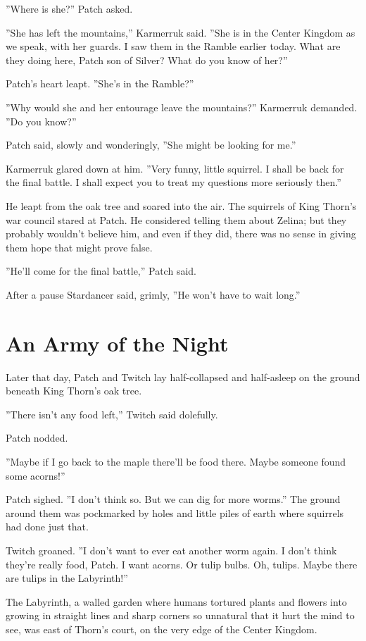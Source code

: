 \documentclass[12pt]{book}
\begin{document}
''Where is she?'' Patch asked.

''She has left the mountains,'' Karmerruk said. ''She is in the Center
Kingdom as we speak, with her guards. I saw them in the Ramble earlier
today. What are they doing here, Patch son of Silver? What do you know
of her?''

Patch's heart leapt. ''She's in the Ramble?''

''Why would she and her entourage leave the mountains?'' Karmerruk
demanded. ''Do you know?''

Patch said, slowly and wonderingly, ''She might be looking for me.''

Karmerruk glared down at him. ''Very funny, little squirrel. I shall
be back for the final battle. I shall expect you to treat my questions
more seriously then.''

He leapt from the oak tree and soared into the air. The squirrels of
King Thorn's war council stared at Patch. He considered telling them
about Zelina; but they probably wouldn't believe him, and even if they
did, there was no sense in giving them hope that might prove false.

''He'll come for the final battle,'' Patch said.

After a pause Stardancer said, grimly, ''He won't have to wait long.''


\section{An Army of the Night}

Later that day, Patch and Twitch lay half-collapsed and half-asleep on
the ground beneath King Thorn's oak tree.

''There isn't any food left,'' Twitch said dolefully.

Patch nodded.

''Maybe if I go back to the maple there'll be food there. Maybe
someone found some acorns!''

Patch sighed. ''I don't think so. But we can dig for more worms.'' The
ground around them was pockmarked by holes and little piles of earth
where squirrels had done just that.

Twitch groaned. ''I don't want to ever eat another worm again. I don't
think they're really food, Patch. I want acorns. Or tulip bulbs. Oh,
tulips. Maybe there are tulips in the Labyrinth!''

The Labyrinth, a walled garden where humans tortured plants and
flowers into growing in straight lines and sharp corners so unnatural
that it hurt the mind to see, was east of Thorn's court, on the very
edge of the Center Kingdom.
\end{document}
